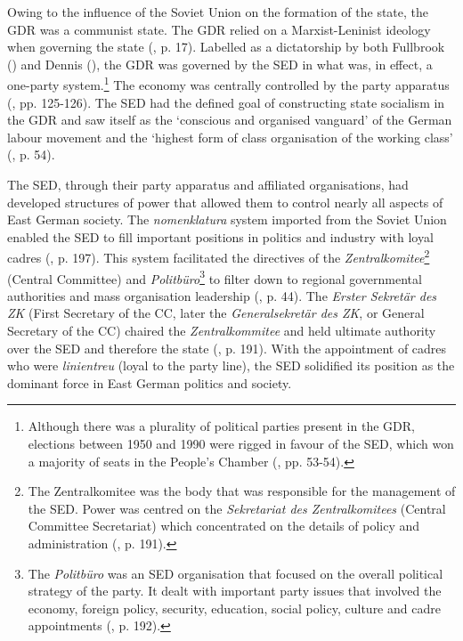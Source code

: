 Owing to the influence of the Soviet Union on the formation of the state, the GDR was a communist state. The GDR relied on a Marxist-Leninist ideology when governing the state (\cite{grixcooke2002}, p. 17). Labelled as a dictatorship by both Fullbrook (\citeyear{fullbrook1995}) and Dennis (\citeyear{dennis2000}), the GDR was governed by the SED in what was, in effect, a one-party system.\footnote{Although there was a plurality of political parties present in the GDR, elections between 1950 and 1990 were rigged in favour of the SED, which won a majority of seats in the People’s Chamber (\cite{dennis2000}, pp. 53-54).}  The economy was centrally controlled by the party apparatus (\cite{quint2012}, pp. 125-126). The SED had the defined goal of constructing state socialism in the GDR and saw itself as the ‘conscious and organised vanguard’ of the German labour movement and the ‘highest form of class organisation of the working class’ (\cite{dennis2000}, p. 54).

The SED, through their party apparatus and affiliated organisations, had developed structures of power that allowed them to control nearly all aspects of East German society. The \textit{nomenklatura} system imported from the Soviet Union enabled the SED to fill important positions in politics and industry with loyal cadres (\cite{dennis2000}, p. 197). This system facilitated the directives of the \textit{Zentralkomitee}\footnote{The Zentralkomitee was the body that was responsible for the management of the SED. Power was centred on the \textit{Sekretariat des Zentralkomitees} (Central Committee Secretariat) which concentrated on the details of policy and administration (\cite{dennis2000}, p. 191).} (Central Committee) and \textit{Politbüro}\footnote{The \textit{Politbüro} was an SED organisation that focused on the overall political strategy of the party. It dealt with important party issues that involved the economy, foreign policy, security, education, social policy, culture and cadre appointments (\cite{dennis2000}, p. 192).} to filter down to regional governmental authorities and mass organisation leadership (\cite{fullbrook1995}, p. 44). The \textit{Erster Sekretär des ZK} (First Secretary of the CC, later the \textit{Generalsekretär des ZK}, or General Secretary of the CC) chaired the \textit{Zentralkommitee} and held ultimate authority over the SED and therefore the state (\cite{dennis2000}, p. 191). With the appointment of cadres who were \textit{linientreu} (loyal to the party line), the SED solidified its position as the dominant force in East German politics and society.

